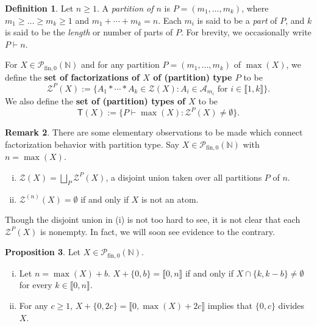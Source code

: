 \documentclass{report}
\newcommand{\NN}{\mathbb{N}}
\renewcommand{\P}{\mathcal{P}}
\newcommand{\Z}{\mathcal{Z}}
\newcommand{\llb}{\llbracket}
\newcommand{\rrb}{\rrbracket}
\newcommand{\fin}{\textrm{fin}}
\renewcommand{\:}{\text{:}}
\newcommand{\PN}{{\P_{\fin,0}(\NN)}}
\theoremstyle{definition}
\newtheorem{defn}{Definition}[section]
\newtheorem{prop}[defn]{Proposition}
\newtheorem{rk}[defn]{Remark}
\begin{document}
\begin{defn}
Let $n\ge 1$. A \textit{partition of $n$} is $P = (m_1,\dots, m_k)$, where $m_1 \ge \dots \ge m_k \ge 1$ and $m_1+\cdots + m_k = n$. 
Each $m_i$ is said to be a \textit{part} of $P$, and $k$ is said to be the \textit{length} or number of parts of $P$.
For brevity, we occasionally write $P \vdash n$.

For $X \in \PN$ and for any partition $P = (m_1,\dots, m_k)$ of $\max(X)$, we define the \textbf{set of factorizations of $X$ of (partition) type $P$} to be
\[ \Z^P(X) := \{ A_1*\cdots * A_k \in \Z(X) : A_i \in \mathcal{A}_{m_i} \textrm{ for } i\in \llb 1,k \rrb \}. \]
We also define the \textbf{set of (partition) types of $X$} to be
\[ \mathsf{T}(X) :=  \{ P \vdash \max(X) : \Z^P(X) \neq \emptyset \}. \]
\end{defn}

\begin{rk}
There are some elementary observations to be made which connect factorization behavior with partition type.
Say $X \in \PN$ with $n = \max(X)$.
\begin{enumerate}[(i)]
\item $\Z(X) = \bigsqcup_{P} \Z^P(X)$, a disjoint union taken over all partitions $P$ of $n$.
\item $\Z^{(n)}(X) = \emptyset$ if and only if $X$ is not an atom.
\end{enumerate}
Though the disjoint union in (i) is not too hard to see, it is not clear that each $\Z^P(X)$ is nonempty.
In fact, we will soon see evidence to the contrary.
\end{rk}



\begin{prop} \label{prop:2-elt factor/cofactor}
Let $X\in \PN$.
\begin{enumerate}[(i)]
\item Let $n = \max(X) + b$. $X + \{0,b\} = \llb 0,n \rrb$ if and only if $X \cap \{k,k-b\} \neq \emptyset$ for every $k\in \llb 0,n \rrb$.
\item For any $c\ge 1$, $X + \{0,2c\} = \llb 0,\max(X)+2c \rrb$ implies that $\{0,c\}$ divides $X$.
\end{enumerate}
\end{prop}
\end{document}
